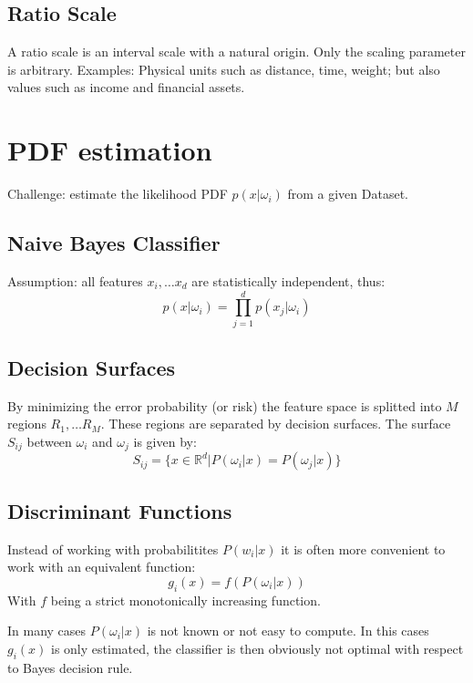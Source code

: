 \subsection{Ratio Scale}
A ratio scale is an interval scale with a natural origin. Only the scaling parameter is arbitrary. Examples: Physical units such as distance, time, weight; but also values such as income and financial assets.

\section{PDF estimation}
Challenge: estimate the likelihood PDF $p(x | \omega_i)$ from a given Dataset.

\subsection{Naive Bayes Classifier}
Assumption: all features $x_i, \ldots x_d$ are statistically independent, thus:
\begin{equation*}
    p(x | \omega_i) = \prod_{j=1}^d p(x_j | \omega_i)
\end{equation*}

\subsection{Decision Surfaces}
By minimizing the error probability (or risk) the feature space is splitted into $M$ regions $R_1, \ldots R_M$. These regions are separated by decision surfaces. The surface $S_{ij}$ between $\omega_i$ and $\omega_j$ is given by:
\begin{equation*}
    S_{ij} = \{x \in \mathbb{R}^d | P(\omega_i | x) = P(\omega_j | x)\}
\end{equation*}

\subsection{Discriminant Functions}
Instead of working with probabilitites $P(w_i | x)$ it is often more convenient to work with an equivalent function:
\begin{equation*}
    g_i(x) = f(P(\omega_i | x))
\end{equation*}
With $f$ being a strict  monotonically increasing function.

In many cases $P(\omega_i | x)$ is not known or not easy to compute. In this cases $g_i(x)$ is only estimated, the classifier is then obviously not optimal with respect to Bayes decision rule.

